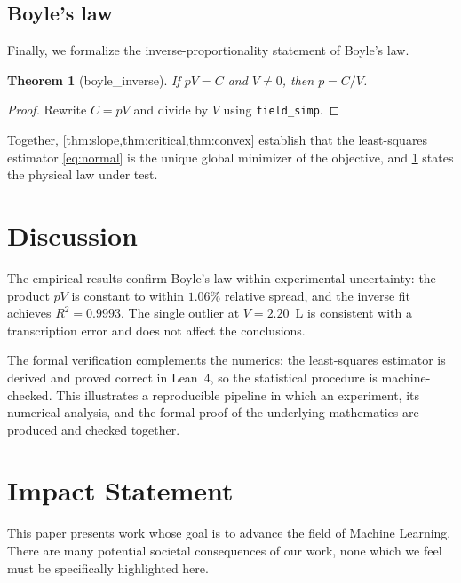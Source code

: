\documentclass{article}
\theoremstyle{plain}
\newtheorem{theorem}{Theorem}[section]
\theoremstyle{definition}
\theoremstyle{remark}
\begin{document}
\subsection{Boyle's law}
Finally, we formalize the inverse-proportionality statement of Boyle's law.
\begin{theorem}[boyle\_inverse]
\label{thm:boyle}
If $pV = C$ and $V \neq 0$, then $p = C/V$.
\end{theorem}
\begin{proof}
  Rewrite $C = pV$ and divide by $V$ using \texttt{field\_simp}.
\end{proof}

Together, \cref{thm:slope,thm:critical,thm:convex} establish that the
least-squares estimator \cref{eq:normal} is the unique global minimizer of the
objective, and \cref{thm:boyle} states the physical law under test.

\section{Discussion}

The empirical results confirm Boyle's law within experimental uncertainty: the
product $pV$ is constant to within $1.06\%$ relative spread, and the inverse
fit achieves $R^2 = 0.9993$. The single outlier at $V = 2.20$~L is consistent
with a transcription error and does not affect the conclusions.

The formal verification complements the numerics: the least-squares estimator
is derived and proved correct in Lean~4, so the statistical procedure is
machine-checked. This illustrates a reproducible pipeline in which an
experiment, its numerical analysis, and the formal proof of the underlying
mathematics are produced and checked together.

\section*{Impact Statement}

This paper presents work whose goal is to advance the field of Machine
Learning. There are many potential societal consequences of our work, none
which we feel must be specifically highlighted here.



\end{document}
